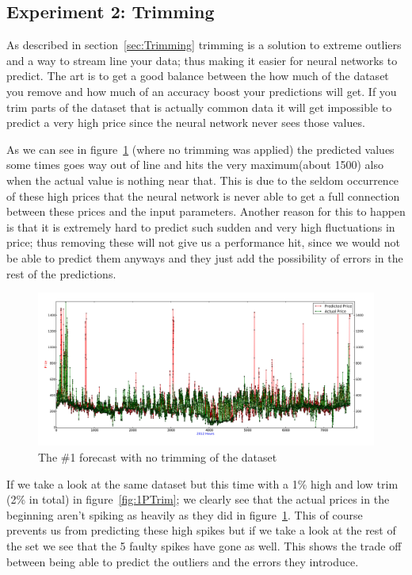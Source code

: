 \subsection{Experiment 2: Trimming}
As described in section~\ref{sec:Trimming} trimming is a solution to extreme outliers and a way to stream line your data; thus making it easier for neural networks to predict. The art is to get a good balance between the how much of the dataset you remove and how much of an accuracy boost your predictions will get. If you trim parts of the dataset that is actually common data it will get impossible to predict a very high price since the neural network never sees those values.

As we can see in figure~\ref{fig:NoTrim} (where no trimming was applied) the predicted values some times goes way out of line and hits the very maximum(about 1500) also when the actual value is nothing near that. This is due to the seldom occurrence of these high prices that the neural network is never able to get a full connection between these prices and the input parameters. Another reason for this to happen is that it is extremely hard to predict such sudden and very high fluctuations in price; thus removing these will not give us a performance hit, since we would not be able to predict them anyways and they just add the possibility of errors in the rest of the predictions.

\begin{figure}[H]
\centering
\includegraphics[width=0.85\linewidth,natwidth=898,natheight=587]{billeder/PriceExperimentalAnalysis/NoTrimming.jpg}
\caption{The \#1 forecast with no trimming of the dataset}
\label{fig:NoTrim}
\end{figure}

If we take a look at the same dataset but this time with a 1\% high and low trim (2\% in total) in figure~\ref{fig:1PTrim}; we clearly see that the actual prices in the beginning aren't spiking as heavily as they did in figure~\ref{fig:NoTrim}. This of course prevents us from predicting these high spikes but if we take a look at the rest of the set we see that the 5 faulty spikes have gone as well. This shows the trade off between being able to predict the outliers and the errors they introduce.

